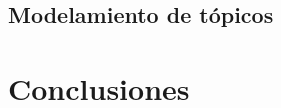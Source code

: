 \documentclass[
	spanish, %
	letterpaper, oneside
]{article}
\begin{document}
\subsection{Modelamiento de tópicos}

\lipsum[8]



\section{Conclusiones}

\lipsum[9]

\iffalse
\begin{images}[\label{figure:glove}]{Descripción general}
    \addimage{img1}{width=5.5cm}{}
    \addimage{img2}{width=5.3cm}{}
    \imagesnewline
    \addimage{img3}{width=9cm}{}
\end{images}
\fi


\end{document}
